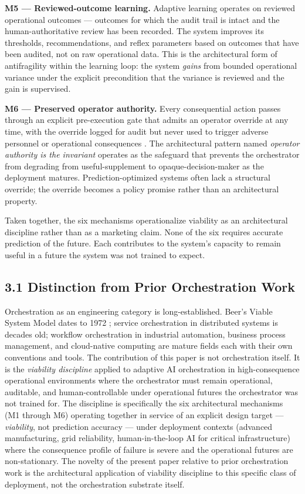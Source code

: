 \textbf{M5 --- Reviewed-outcome learning.} Adaptive learning operates on
reviewed operational outcomes --- outcomes for which the audit trail is
intact and the human-authoritative review has been recorded. The system
improves its thresholds, recommendations, and reflex parameters based on
outcomes that have been audited, not on raw operational data. This is
the architectural form of antifragility within the learning loop: the
system \emph{gains} from bounded operational variance under the explicit
precondition that the variance is reviewed and the gain is supervised.

\textbf{M6 --- Preserved operator authority.} Every consequential action
passes through an explicit pre-execution gate that admits an operator
override at any time, with the override logged for audit but never used
to trigger adverse personnel or operational consequences \cite{ref4}. The
architectural pattern named \emph{operator authority is the invariant}
operates as the safeguard that prevents the orchestrator from degrading
from useful-supplement to opaque-decision-maker as the deployment
matures. Prediction-optimized systems often lack a structural override;
the override becomes a policy promise rather than an architectural
property.

Taken together, the six mechanisms operationalize viability as an
architectural discipline rather than as a marketing claim. None of the
six requires accurate prediction of the future. Each contributes to the
system's capacity to remain useful in a future the system was not
trained to expect.

\subsection{3.1 Distinction from Prior Orchestration
Work}\label{distinction-from-prior-orchestration-work}

Orchestration as an engineering category is long-established. Beer's
Viable System Model dates to 1972 \cite{ref1}; service orchestration in
distributed systems is decades old; workflow orchestration in industrial
automation, business process management, and cloud-native computing are
mature fields each with their own conventions and tools. The
contribution of this paper is not orchestration itself. It is the
\emph{viability discipline} applied to adaptive AI orchestration in
high-consequence operational environments where the orchestrator must
remain operational, auditable, and human-controllable under operational
futures the orchestrator was not trained for. The discipline is
specifically the six architectural mechanisms (M1 through M6) operating
together in service of an explicit design target --- \emph{viability},
not prediction accuracy --- under deployment contexts (advanced
manufacturing, grid reliability, human-in-the-loop AI for critical
infrastructure) where the consequence profile of failure is severe and
the operational futures are non-stationary. The novelty of the present
paper relative to prior orchestration work is the architectural
application of viability discipline to this specific class of
deployment, not the orchestration substrate itself.

